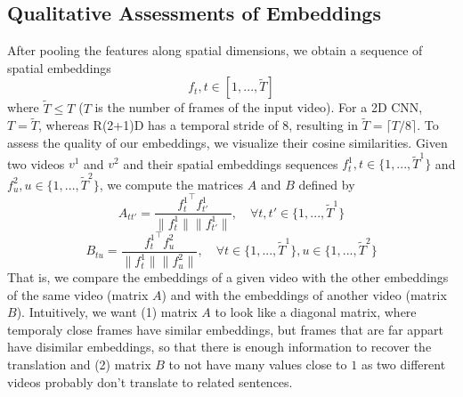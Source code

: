 \documentclass[final]{cvpr}
\begin{document}
\subsection{Qualitative Assessments of Embeddings}
After pooling the features along spatial dimensions, we obtain a sequence of spatial embeddings
$$f_t, t\in[1, ..., \tilde{T}]$$
where $\tilde{T}\leq T$ ($T$ is the number of frames of the input video). For a 2D CNN, $T=\tilde{T}$, whereas R(2+1)D has a temporal stride of $8$, resulting in $\tilde{T} = \lceil T/8 \rceil$.
To assess the quality of our embeddings, we visualize their cosine similarities. Given two videos $v^1$ and $v^2$ and their spatial embeddings sequences $f_t^1, t\in\{1, ..., \tilde{T}^1\}$ and $f_u^2, u\in \{1, ...,  \tilde{T}^2\}$, we compute the matrices $A$ and $B$ defined by
$$A_{tt'} = \frac{{f_t^1}^\intercal f_{t'}^1}{\lVert f_t^1 \rVert \lVert f_{t'}^1 \rVert}, \quad\forall t, t' \in\{1, ..., \tilde{T}^1\}$$
$$B_{tu} = \frac{{f_t^1}^\intercal f_u^2}{\lVert f_t^1 \rVert \lVert f_u^2 \rVert}, \quad \forall t \in\{1, ..., \tilde{T}^1\}, u \in\{1, ..., \tilde{T}^2\}$$
That is, we compare the embeddings of a given video with the other embeddings of the same video (matrix $A$) and with the embeddings of another video (matrix $B$). Intuitively, we want 
(1) matrix $A$ to look like a diagonal matrix, where temporaly close frames have similar embeddings, but frames that are far appart have disimilar embeddings, so that there is enough information to recover the translation and (2) matrix $B$ to not have many values close to $1$ as two different videos probably don't translate to related sentences.
\end{document}
